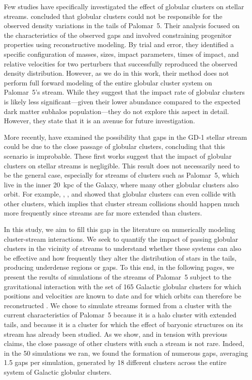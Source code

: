     Few studies have specifically investigated the effect of globular clusters on stellar streams. \citet{2017MNRAS.470...60E} concluded that globular clusters could not be responsible for the observed density variations in the tails of Palomar~5. Their analysis focused on the characteristics of the observed gaps and involved constraining progenitor properties using reconstructive modeling. By trial and error, they identified a specific configuration of masses, sizes, impact parameters, times of impact, and relative velocities for two perturbers that successfully reproduced the observed density distribution. However, as we do in this work, their method does not perform full forward modeling of the entire globular cluster system on Palomar~5's stream. While they suggest that the impact rate of globular clusters is likely less significant---given their lower abundance compared to the expected dark matter subhalos population---they do not explore this aspect in detail. However, they state that it is an avenue for future investigation. 

    More recently, \citet{2022ApJ...941..129D} have examined the possibility that gaps in the GD-1 stellar stream could be due to the close passage of globular clusters, concluding that this scenario is improbable. These first works suggest that the impact of globular clusters on stellar streams is negligible. This result does not necessarily need to be the general case, especially for streams of clusters such as Palomar~5, which live in the inner 20~kpc of the Galaxy, where many other globular clusters also orbit. For example, \citet{2018A&A...620A.154K}, \citet{2019A&A...622A..86M}, and \citet{2023A&A...678A..69I} showed that globular clusters can even collide with other clusters, which implies that cluster stream collisions should happen much more frequently since streams are far more extended than clusters. 

    In this study, we aim to fill this gap in the literature on numerically modeling cluster-stream interactions. We seek to quantify the impact of passing globular clusters in the vicinity of streams to understand whether these systems can also be effective and how frequently they alter the distribution of stars in the tails, producing underdense regions or gaps. To this end, in the following pages, we present the results of simulations of the streams of Palomar~5 subject to the gravitational interaction with the set of 165 Galactic globular clusters for which positions and velocities are known to date and for which orbits can therefore be reconstructed \parencite{2021MNRAS.505.5957B}. We chose to simulate streams formed from a cluster with the current characteristics of Palomar~5 because it is a halo cluster with extended tails, and because it is a cluster for which the effect of baryonic structures on its stream has already been studied. As we show, and in tension with previous claims, the close passage of other clusters with such a stream is not rare. Indeed, in the 50 simulations we ran, we found the formation of numerous gaps, averaging 1.5 gaps per simulation, generated by 18 different clusters across the entire system of Galactic globular clusters.

